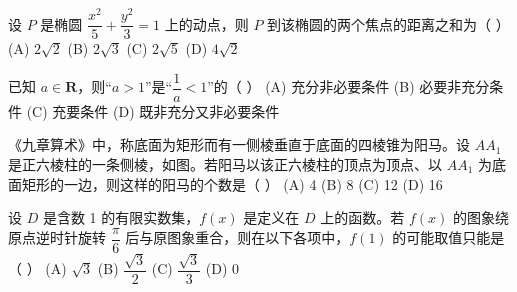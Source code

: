 \begin{question}
设 $P$ 是椭圆 $\dfrac{x^2}{5} + \dfrac{y^2}{3} = 1$ 上的动点，则 $P$ 到该椭圆的两个焦点的距离之和为（ ）
(A) $2\sqrt{2}$
(B) $2\sqrt{3}$
(C) $2\sqrt{5}$
(D) $4\sqrt{2}$

\end{question}
\begin{question}
已知 $a \in \mathbf{R}$，则“$a > 1$”是“$\dfrac{1}{a} < 1$”的（ ）
(A) 充分非必要条件
(B) 必要非充分条件
(C) 充要条件
(D) 既非充分又非必要条件

\Needspace{0.4\textheight}
\end{question}
\begin{question}
《九章算术》中，称底面为矩形而有一侧棱垂直于底面的四棱锥为阳马。设 $AA_1$ 是正六棱柱的一条侧棱，如图。若阳马以该正六棱柱的顶点为顶点、以 $AA_1$ 为底面矩形的一边，则这样的阳马的个数是（ ）
(A) 4
(B) 8
(C) 12
(D) 16
\nopagebreak[4]
\begin{center}\end{center}
\nopagebreak[4]
\end{question}
\begin{question}
设 $D$ 是含数 1 的有限实数集，$f(x)$ 是定义在 $D$ 上的函数。若 $f(x)$ 的图象绕原点逆时针旋转 $\dfrac{\pi}{6}$ 后与原图象重合，则在以下各项中，$f(1)$ 的可能取值只能是（ ）
(A) $\sqrt{3}$
(B) $\dfrac{\sqrt{3}}{2}$
(C) $\dfrac{\sqrt{3}}{3}$
(D) 0

\par\medskip

\end{question}

